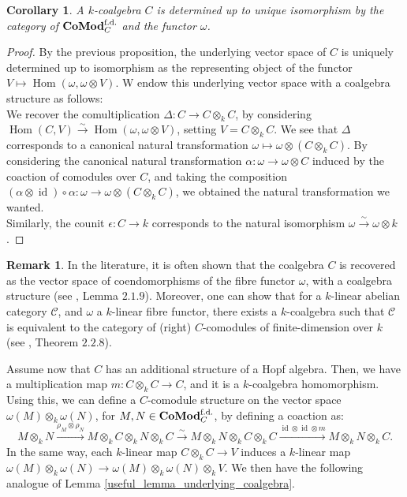 \documentclass{article}
\theoremstyle{plain}
\newtheorem{corollary}[theorem]{Corollary}
\theoremstyle{definition}
\newtheorem{remark}{Remark}
\DeclareMathOperator{\Hom}{Hom}
\DeclareMathOperator{\id}{id}
\DeclareMathOperator{\Comod}{\bf{CoMod}}
\begin{document}
\begin{corollary}
    A $k$-coalgebra $C$ is determined up to unique isomorphism by the category of $\Comod^{\text{f.d.}}_C$ and the functor $\omega$.
\end{corollary}
\begin{proof}
    By the previous proposition, the underlying vector space of $C$ is uniquely determined up to isomorphism as the representing object of the functor $V\mapsto \Hom(\omega, \omega\otimes V)$.
    W endow this underlying vector space with a coalgebra structure as follows:\\
    We recover the comultiplication $\Delta : C \rightarrow C\otimes_k C$, by considering $\Hom(C,V)\xrightarrow{\sim} \Hom(\omega, \omega\otimes V)$, setting $V= C\otimes_k C$. 
    We see that $\Delta$ corresponds to a canonical natural transformation $\omega\mapsto \omega \otimes (C\otimes_k C)$.
    By considering the canonical natural transformation $\alpha : \omega\rightarrow \omega \otimes C$ induced by the coaction of comodules over $C$, and taking the composition $(\alpha \otimes \id) \circ \alpha :\omega\rightarrow \omega \otimes (C\otimes_k C)$, we obtained the natural transformation we wanted.\\
    Similarly, the counit $\epsilon : C\rightarrow k$ corresponds to the natural isomorphism $\omega\xrightarrow{\sim}\omega\otimes k$.

\end{proof}

\begin{remark}
\label{remark_abelian_category}
    In the literature, it is often shown that the coalgebra $C$ is recovered as the vector space of coendomorphisms of the fibre functor $\omega$, with a coalgebra structure (see \cite{Schauenburg}, Lemma $2.1.9$).
    Moreover, one can show that for a $k$-linear abelian category $\mathcal{C}$, and $\omega$ a $k$-linear fibre functor, there exists a $k$-coalgebra such that $\mathcal{C}$ is equivalent to the category of (right) $C$-comodules of finite-dimension over $k$ (see \cite{Schauenburg}, Theorem $2.2.8$).
\end{remark}


\noindent Assume now that $C$ has an additional structure of a Hopf algebra. 
Then, we have a multiplication map $m: C\otimes_k C\rightarrow C$, and it is a $k$-coalgebra homomorphism.
Using this, we can define a $C$-comodule structure on the vector space $\omega(M)\otimes_k \omega(N)$, for $M,N\in \Comod_C^{\text{f.d.}}$, by defining a coaction as:
$$M\otimes_k N\xrightarrow{\rho_M\otimes\rho_N} M\otimes_k C \otimes_k N \otimes_k C \xrightarrow{\sim} M \otimes_k N \otimes_k  C \otimes_k C \xrightarrow{\id\otimes \id \otimes m} M \otimes_k N\otimes_k C.$$
In the same way, each $k$-linear map $C\otimes_k C\rightarrow V$ induces a $k$-linear map $\omega(M)\otimes_k \omega(N) \rightarrow \omega(M)\otimes_k \omega(N)\otimes_k V$. 
We then have the following analogue of Lemma \ref{useful_lemma_underlying_coalgebra}.
\end{document}
